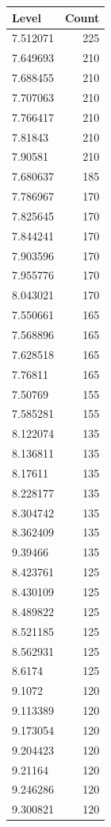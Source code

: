\begin{table}[ht]
\centering
\begin{tabular}{lr}
  \hline
Level & Count \\ 
  \hline
7.512071 & 225 \\ 
  7.649693 & 210 \\ 
  7.688455 & 210 \\ 
  7.707063 & 210 \\ 
  7.766417 & 210 \\ 
  7.81843 & 210 \\ 
  7.90581 & 210 \\ 
  7.680637 & 185 \\ 
  7.786967 & 170 \\ 
  7.825645 & 170 \\ 
  7.844241 & 170 \\ 
  7.903596 & 170 \\ 
  7.955776 & 170 \\ 
  8.043021 & 170 \\ 
  7.550661 & 165 \\ 
  7.568896 & 165 \\ 
  7.628518 & 165 \\ 
  7.76811 & 165 \\ 
  7.50769 & 155 \\ 
  7.585281 & 155 \\ 
  8.122074 & 135 \\ 
  8.136811 & 135 \\ 
  8.17611 & 135 \\ 
  8.228177 & 135 \\ 
  8.304742 & 135 \\ 
  8.362409 & 135 \\ 
  9.39466 & 135 \\ 
  8.423761 & 125 \\ 
  8.430109 & 125 \\ 
  8.489822 & 125 \\ 
  8.521185 & 125 \\ 
  8.562931 & 125 \\ 
  8.6174 & 125 \\ 
  9.1072 & 120 \\ 
  9.113389 & 120 \\ 
  9.173054 & 120 \\ 
  9.204423 & 120 \\ 
  9.21164 & 120 \\ 
  9.246286 & 120 \\ 
  9.300821 & 120 \\ 

\end{tabular}
\end{table}
